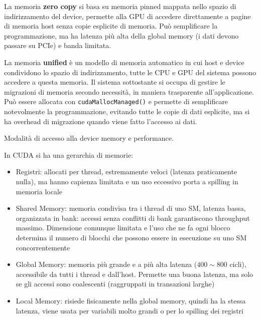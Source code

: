 \begin{questions}
\begin{solution}
        La memoria \textbf{zero copy} si basa su memoria pinned mappata nello spazio di indirizzamento del device, permette alla GPU di accedere direttamente a pagine di memoria host senza copie esplicite di memoria. Può semplificare la programmazione, ma ha latenza più alta della global memory (i dati devono passare su PCIe) e banda limitata.
        
        La memoria \textbf{unified} è un modello di memoria automatico in cui host e device condividono lo spazio di indirizzamento, tutte le CPU e GPU del sistema possono accedere a questa memoria. Il sistema sottostante si occupa di gestire le migrazioni di memoria secondo necessità, in maniera trasparente all'applicazione. Può essere allocata con \texttt{cudaMallocManaged()} e permette di semplificare notevolmente la programmazione, evitando tutte le copie di dati esplicite, ma si ha overhead di migrazione quando viene fatto l'accesso ai dati.
    \end{solution}
    
    \question Modalità di accesso alla device memory e performance.
    
    \begin{solution}
        In CUDA si ha una gerarchia di memorie: 
        \begin{itemize}
            \item Registri: allocati per thread, estremamente veloci (latenza praticamente nulla), ma hanno capienza limitata e un uso eccessivo porta a spilling in memoria locale
            
            \item Shared Memory: memoria condivisa tra i thread di uno SM, latenza bassa, organizzata in bank: accessi senza conflitti di bank garantiscono throughput massimo. Dimensione comunque limitata e l'uso che ne fa ogni blocco determina il numero di blocchi che possono essere in esecuzione su uno SM concorrentemente
            
            \item Global Memory: memoria più grande e a più alta latenza ($400 \sim 800$ cicli), accessibile da tutti i thread e dall'host. Permette una buona latenza, ma solo se gli accessi sono coalescenti (raggruppati in transazioni larghe)
            
            \item Local Memory: risiede fisicamente nella global memory, quindi ha la stessa latenza, viene usata per variabili molto grandi o per lo spilling dei registri
            

\end{itemize}
\end{solution}
\end{questions}
